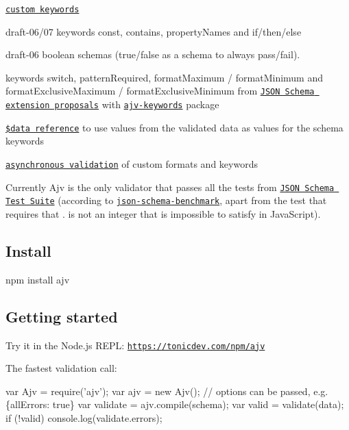 \begin{DoxyItemize}
\item \href{#defining-custom-keywords}{\tt custom keywords}
\item draft-\/06/07 keywords {\ttfamily const}, {\ttfamily contains}, {\ttfamily property\+Names} and {\ttfamily if/then/else}
\item draft-\/06 boolean schemas ({\ttfamily true}/{\ttfamily false} as a schema to always pass/fail).
\item keywords {\ttfamily switch}, {\ttfamily pattern\+Required}, {\ttfamily format\+Maximum} / {\ttfamily format\+Minimum} and {\ttfamily format\+Exclusive\+Maximum} / {\ttfamily format\+Exclusive\+Minimum} from \href{https://github.com/json-schema/json-schema/wiki/v5-Proposals}{\tt J\+S\+ON Schema extension proposals} with \href{https://github.com/epoberezkin/ajv-keywords}{\tt ajv-\/keywords} package
\item \href{#data-reference}{\tt \$data reference} to use values from the validated data as values for the schema keywords
\item \href{#asynchronous-validation}{\tt asynchronous validation} of custom formats and keywords
\end{DoxyItemize}

Currently Ajv is the only validator that passes all the tests from \href{https://github.com/json-schema/JSON-Schema-Test-Suite}{\tt J\+S\+ON Schema Test Suite} (according to \href{https://github.com/ebdrup/json-schema-benchmark}{\tt json-\/schema-\/benchmark}, apart from the test that requires that {.} is not an integer that is impossible to satisfy in Java\+Script).

\subsection*{Install}


\begin{DoxyCode}
npm install ajv
\end{DoxyCode}


\subsection*{\label{_usage}%
Getting started}

Try it in the Node.\+js R\+E\+PL\+: \href{https://tonicdev.com/npm/ajv}{\tt https\+://tonicdev.\+com/npm/ajv}

The fastest validation call\+:


\begin{DoxyCode}
var Ajv = require('ajv');
var ajv = new Ajv(); // options can be passed, e.g. \{allErrors: true\}
var validate = ajv.compile(schema);
var valid = validate(data);
if (!valid) console.log(validate.errors);
\end{DoxyCode}



